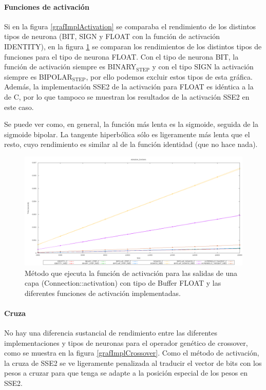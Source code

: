 \documentclass[11pt]{article}
\begin{document}
\begin{titlepage}
\paragraph{Funciones de activación}
\label{sec-6-1-1-3}


Si en la figura \ref{grafImplActivation} se comparaba el rendimiento de los distintos tipos de neurona (BIT, SIGN y FLOAT con la función de activación IDENTITY), en la figura \ref{grafImplActivationFunc} se comparan los rendimientos de los distintos tipos de funciones para el tipo de neurona FLOAT. Con el tipo de neurona BIT, la función de activación siempre es BINARY$_{\mathrm{STEP}}$ y con el tipo SIGN la activación siempre es BIPOLAR$_{\mathrm{STEP}}$, por ello podemos excluir estos tipos de esta gráfica. Además, la implementación SSE2 de la activación para FLOAT es idéntica a la de C, por lo que tampoco se muestran los resultados de la activación SSE2 en este caso.

Se puede ver como, en general, la función más lenta es la sigmoide, seguida de la sigmoide bipolar. La tangente hiperbólica sólo es ligeramente más lenta que el resto, cuyo rendimiento es similar al de la función identidad (que no hace nada).

\begin{figure}[htb]
\centering
\includegraphics[width=\textwidth]{./img/Activation_functions.png}
\caption{\label{grafImplActivationFunc}Método que ejecuta la función de activación para las salidas de una capa (Connection::activation) con tipo de Buffer FLOAT y las diferentes funciones de activación implementadas.}
\end{figure}
\newpage
\paragraph{Cruza}
\label{sec-6-1-1-4}


No hay una diferencia sustancial de rendimiento entre las diferentes implementaciones y tipos de neuronas para el operador genético de crossover, como se muestra en la figura \ref{grafImplCrossover}. Como el método de activación, la cruza de SSE2 se ve ligeramente penalizada al traducir el vector de bits con los pesos a cruzar para que tenga se adapte a la posición especial de los pesos en SSE2.


\end{titlepage}
\end{document}
